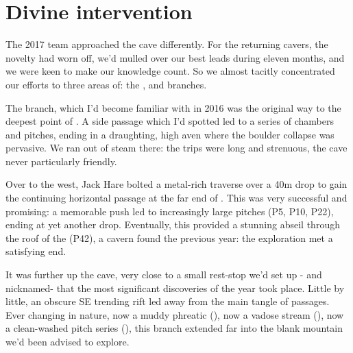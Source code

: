 \section{Divine intervention}
The 2017 team approached the cave differently. For the returning cavers, the novelty had worn off, we’d mulled over our best leads during eleven months, and we were keen to make our knowledge count. So we almost tacitly concentrated our efforts to three areas of: the ,  and  branches.

The  branch, which I’d become familiar with in 2016 was the original way to the deepest point of . A side passage which I’d spotted led to a series of chambers and pitches, ending in a draughting, high aven where the boulder collapse was pervasive. We ran out of steam there: the trips were long and strenuous, the cave never particularly friendly.

Over to the west, Jack Hare bolted a metal-rich traverse over a 40m drop to gain the continuing horizontal passage at the far end of . This was very successful and promising: a memorable push led to increasingly large pitches (P5, P10, P22), ending at yet another drop. Eventually, this provided a stunning abseil through the roof of the  (P42), a cavern found the previous year: the exploration met a satisfying end.

It was further up the cave, very close to a small rest-stop we’d set up - and nicknamed- that the most significant discoveries of the year took place. Little by little, an obscure SE trending rift led away from the main tangle of passages. Ever changing in nature, now a muddy phreatic (), now a vadose stream (), now a clean-washed pitch series (), this branch extended far into the blank mountain we’d been advised to explore.  

